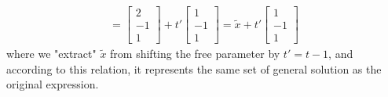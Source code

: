 {\begin{align*}
=
\begin{bmatrix}
2 \\
-1 \\
1
\end{bmatrix}
+
t'
\begin{bmatrix}
1 \\
-1 \\
1
\end{bmatrix}
= \tilde{x} + t'
\begin{bmatrix}
1 \\
-1 \\
1
\end{bmatrix}
\end{align*}
where we "extract" $\tilde{x}$ from shifting the free parameter by $t' = t-1$, and according to this relation, it represents the same set of general solution as the original expression.}\\
\par
